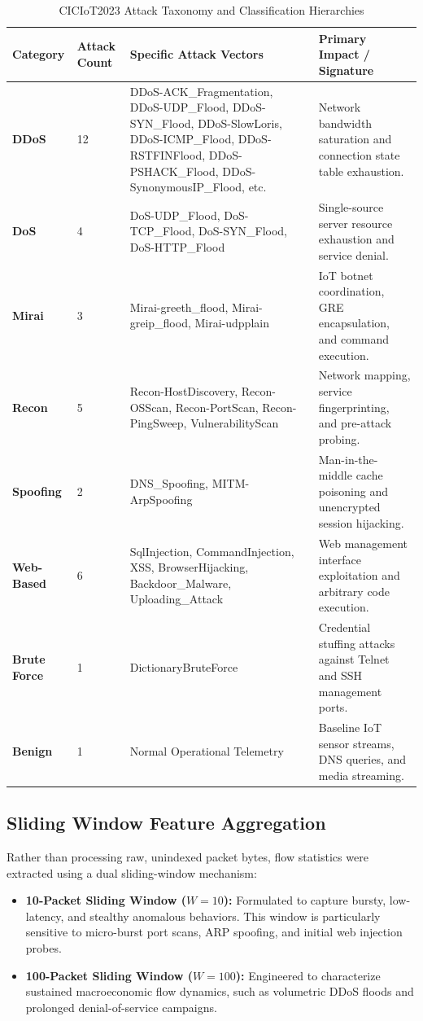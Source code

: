 \documentclass[12pt,a4paper]{report}
\begin{document}
\begin{table}[ht]
\centering
\caption{CICIoT2023 Attack Taxonomy and Classification Hierarchies}
\label{tab:attack_taxonomy}
\small
\begin{tabular}{@{}lp{1.8cm}p{5.5cm}p{4cm}@{}}
\toprule
\textbf{Category} & \textbf{Attack Count} & \textbf{Specific Attack Vectors} & \textbf{Primary Impact / Signature} \\
\midrule
\textbf{DDoS} & 12 & DDoS-ACK\_Fragmentation, DDoS-UDP\_Flood, DDoS-SYN\_Flood, DDoS-SlowLoris, DDoS-ICMP\_Flood, DDoS-RSTFINFlood, DDoS-PSHACK\_Flood, DDoS-SynonymousIP\_Flood, etc. & Network bandwidth saturation and connection state table exhaustion. \\
\addlinespace
\textbf{DoS} & 4 & DoS-UDP\_Flood, DoS-TCP\_Flood, DoS-SYN\_Flood, DoS-HTTP\_Flood & Single-source server resource exhaustion and service denial. \\
\addlinespace
\textbf{Mirai} & 3 & Mirai-greeth\_flood, Mirai-greip\_flood, Mirai-udpplain & IoT botnet coordination, GRE encapsulation, and command execution. \\
\addlinespace
\textbf{Recon} & 5 & Recon-HostDiscovery, Recon-OSScan, Recon-PortScan, Recon-PingSweep, VulnerabilityScan & Network mapping, service fingerprinting, and pre-attack probing. \\
\addlinespace
\textbf{Spoofing} & 2 & DNS\_Spoofing, MITM-ArpSpoofing & Man-in-the-middle cache poisoning and unencrypted session hijacking. \\
\addlinespace
\textbf{Web-Based} & 6 & SqlInjection, CommandInjection, XSS, BrowserHijacking, Backdoor\_Malware, Uploading\_Attack & Web management interface exploitation and arbitrary code execution. \\
\addlinespace
\textbf{Brute Force} & 1 & DictionaryBruteForce & Credential stuffing attacks against Telnet and SSH management ports. \\
\addlinespace
\textbf{Benign} & 1 & Normal Operational Telemetry & Baseline IoT sensor streams, DNS queries, and media streaming. \\
\bottomrule
\end{tabular}
\end{table}

\subsection{Sliding Window Feature Aggregation}
Rather than processing raw, unindexed packet bytes, flow statistics were extracted using a dual sliding-window mechanism:
\begin{itemize}
    \item \textbf{10-Packet Sliding Window ($W=10$):} Formulated to capture bursty, low-latency, and stealthy anomalous behaviors. This window is particularly sensitive to micro-burst port scans, ARP spoofing, and initial web injection probes.
    \item \textbf{100-Packet Sliding Window ($W=100$):} Engineered to characterize sustained macroeconomic flow dynamics, such as volumetric DDoS floods and prolonged denial-of-service campaigns.
\end{itemize}
\end{document}
